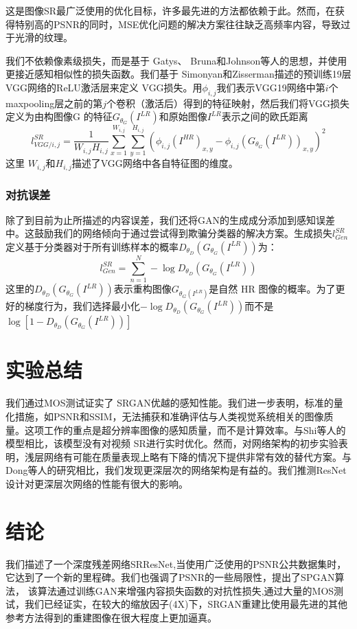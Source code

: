 \documentclass[UTF8,a4paper,10pt]{ctexrep}
\begin{document}
这是图像SR最广泛使用的优化目标，许多最先进的方法都依赖于此。然而，在获得特别高的PSNR的同时，MSE优化问题的解决方案往往缺乏高频率内容，导致过于光滑的纹理。

我们不依赖像素级损失，而是基于 Gatys、 Bruna和Johnson等人的思想，并使用更接近感知相似性的损失函数。我们基于 Simonyan和Zisserman描述的预训练19层VGG网络的ReLU激活层来定义 VGG损失。用$\phi_{i, j}$我们表示VGG19网络中第$i$个 maxpooling层之前的第$j$个卷积（激活后）得到的特征映射，然后我们将VGG损失定义为由构图像G 的特征$G_{\theta_G}(I^{LR})$和原始图像$I^{LR}$表示之间的欧氏距离
\begin{equation}
  l_{VGG / i, j}^{SR} = \frac{1}{W_{i, j}H_{i, j}}\sum_{x = 1}^{W_{i, j}}\sum_{y = 1}^{H_{i, j}}(\phi_{i, j}(I^{HR})_{x, y} - \phi_{i, j}(G_{\theta_G}(I^{LR}))_{x, y})^2\label{eq:5}
\end{equation}
这里 $W_{i, j}$和$H_{i, j}$描述了VGG网络中各自特征图的维度。

\subsubsection{对抗误差}
除了到目前为止所描述的内容误差，我们还将GAN的生成成分添加到感知误差中。这鼓励我们的网络倾向于通过尝试得到欺骗分类器的解决方案。生成损失$l_{Gen}^{SR}$定义基于分类器对于所有训练样本的概率$D_{\theta_D}(G_{\theta_G}(I^{LR}))$为：
\begin{equation}
  l_{Gen}^{SR} = \sum_{n = 1}^{N} -\log{D_{\theta_D}(G_{\theta_G}(I^{LR}))}\label{eq:6}
\end{equation}
这里的$D_{\theta_D}(G_{\theta_G}(I^{LR}))$表示重构图像$G_{\theta_G(I^{LR})}$是自然 HR 图像的概率。为了更好的梯度行为，我们选择最小化$-\log{D_{\theta_D}(G_{\theta_G}(I^{LR}))}$而不是$\log{[1 - D_{\theta_D}(G_{\theta_G}(I^{LR}))]}$

\section{实验总结}
我们通过MOS测试证实了 SRGAN优越的感知性能。我们进一步表明，标准的量化措施，如PSNR和SSIM，无法捕获和准确评估与人类视觉系统相关的图像质量。这项工作的重点是超分辨率图像的感知质量，而不是计算效率。与Shi等人的模型相比，该模型没有对视频 SR进行实时优化。然而，对网络架构的初步实验表明，浅层网络有可能在质量表现上略有下降的情况下提供非常有效的替代方案。与Dong等人的研究相比，我们发现更深层次的网络架构是有益的。我们推测ResNet 设计对更深层次网络的性能有很大的影响。

\section{结论}
我们描述了一个深度残差网络SRResNet,当使用广泛使用的PSNR公共数据集时，它达到了一个新的里程碑。我们也强调了PSNR的一些局限性，提出了SPGAN算法，
该算法通过训练GAN来增强内容损失函数的对抗性损失,通过大量的MOS测试，我们已经证实，在较大的缩放因子(4X)下，SRGAN重建比使用最先进的其他参考方法得到的重建图像在很大程度上更加逼真。
\end{document}
